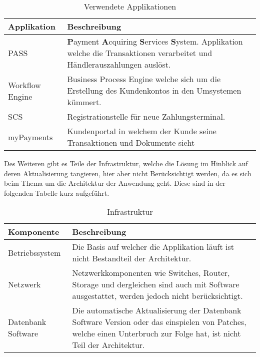 \begin{table}[H]
	\centering
	\caption{Verwendete Applikationen}
	\begin{tabular}{ | p{3cm} | p{11cm} | }
		\toprule
		{\textbf{Applikation}} & {\textbf{Beschreibung}} \\
		\midrule
		PASS & \textbf{P}ayment \textbf{A}cquiring \textbf{S}ervices \textbf{S}ystem. Applikation welche die Transaktionen verarbeitet und Händlerauszahlungen auslöst. \\ \hline
		Workflow Engine & Business Process Engine welche sich um die Erstellung des Kundenkontos in den Umsystemen kümmert.\\ \hline
		SCS & Registrationstelle für neue Zahlungsterminal.\\ \hline
		myPayments & Kundenportal in welchem der Kunde seine Transaktionen und Dokumente sieht \\
		\bottomrule
	\end{tabular}
\end{table}

Des Weiteren gibt es Teile der Infrastruktur, welche die Lösung im Hinblick auf deren Aktualisierung tangieren, hier aber nicht Berücksichtigt werden, da es sich beim Thema um die Architektur der Anwendung geht. Diese sind in der folgenden Tabelle kurz aufgeführt.

\begin{table}[H]
	\centering
	\caption{Infrastruktur}
	\begin{tabular}{ | p{3cm} | p{11cm} | }
		\toprule
		{\textbf{Komponente}} & {\textbf{Beschreibung}} \\
		\midrule
		Betriebssystem & Die Basis auf welcher die Applikation läuft ist nicht Bestandteil der Architektur. \\ \hline
		Netzwerk & Netzwerkkomponenten wie Switches, Router, Storage und dergleichen sind auch mit Software ausgestattet, werden jedoch nicht berücksichtigt.\\ \hline
		Datenbank Software & Die automatische Aktualisierung der Datenbank Software Version oder das einspielen von Patches, welche einen Unterbruch zur Folge hat, ist nicht Teil der Architektur. \\
		\bottomrule
	\end{tabular}
\end{table}

